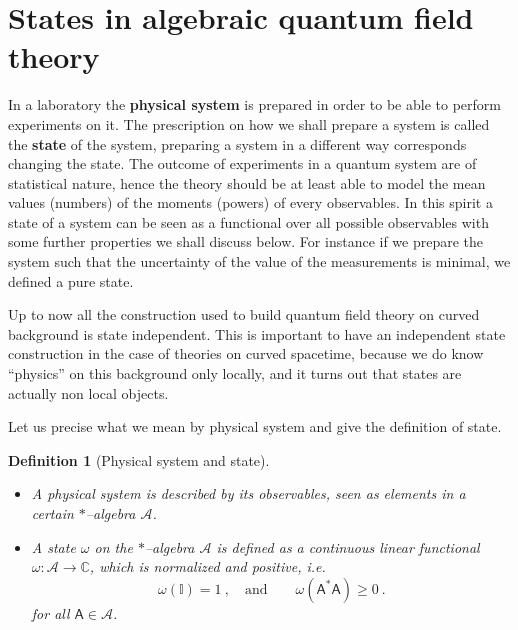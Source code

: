 \documentclass[11pt]{book}
\newcommand{\Acal}{\mathcal{A}}
\newcommand{\Cbb}{\mathbb{C}}
\newcommand{\Ibb}{\mathbb{I}}
\newcommand{\Asf}{\mathsf{A}}
\theoremstyle{break}
\newtheorem{definition}{Definition}[chapter]
\begin{document}
\section{States in algebraic quantum field theory}
\label{p:STATES}


In a laboratory the \textbf{physical system} is prepared in order to be able to perform experiments on it. The prescription on how we shall prepare a system is called the \textbf{state} of the system, preparing a system in a different way corresponds changing the state. The outcome of experiments in a quantum system are of statistical nature, hence the theory should be at least able to model the mean values (numbers) of the moments (powers) of every observables. In this spirit a state of a system can be seen as a functional over all possible observables with some further properties we shall discuss below. For instance if we prepare the system such that the uncertainty of the value of the measurements is minimal, we defined a pure state.


Up to now all the construction used to build quantum field theory on curved background is state independent. This is important to have an independent state construction in the case of theories on curved spacetime, because we do know ``physics''  on this background only locally, and it turns out that states are actually non local objects.


Let us precise what we mean by physical system and give the definition of state.


\begin{definition}[Physical system and state] 
\begin{itemize}
\item A physical system is described by its observables, seen as elements in a certain $\ast$--algebra $\Acal$.
%
\item A state $\omega$ on the $\ast$--algebra $\Acal$ is defined as a continuous linear functional $\omega : \Acal \to \Cbb$, which is normalized and positive, i.e.
%
\begin{equation*}
\omega(\Ibb) =  1 \ , \quad \mbox{and} \qquad \omega(\Asf^\ast \Asf) \geq 0 \ . 
\end{equation*}
%
for all $\Asf \in \Acal$.
\end{itemize}
\end{definition}
\end{document}
